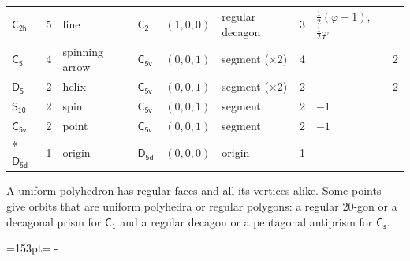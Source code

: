 \documentclass[10pt,a4paper]{article}
\newcommand{\needspace}[1]{\par\penalty-100\begingroup\dimen0=#1\relax\dimen2=\pagegoal
  \advance\dimen2-\pagetotal\ifdim\dimen0>\dimen2\relax\ifdim\dimen2>0pt\vfil\break\fi\fi
  \endgroup}
\numberwithin{equation}{section}
\newcommand{\grp}[1]{\mathsf{#1}}
\newcommand{\goldenratio}{\varphi}
\newlength{\fillwidth}\newlength{\cellwidth}\newlength{\colwidth}
\begin{document}
{{\begin{longtable}{@{}lrllllr>{\RaggedRight\arraybackslash}p{\fillwidth}r@{}}
\href{C2h.pdf}{$\grp{C_{2h}}$} & 5 & line & \href{C2.pdf}{$\grp{C_{2}}$} & $(1, 0, 0)$ & regular decagon & 3 & ${\tfrac{1}{2}(\goldenratio - 1)}$, ${\tfrac{1}{2}\goldenratio{}}$ & \\
\href{C5.pdf}{$\grp{C_{5}}$} & 4 & spinning arrow & \href{C5v.pdf}{$\grp{C_{5v}}$} & $(0, 0, 1)$ & segment (${\times}2$) & 4 &  & 2\\
\href{D5.pdf}{$\grp{D_{5}}$} & 2 & helix & \href{C5v.pdf}{$\grp{C_{5v}}$} & $(0, 0, 1)$ & segment (${\times}2$) & 2 &  & 2\\
\href{S10.pdf}{$\grp{S_{10}}$} & 2 & spin & \href{C5v.pdf}{$\grp{C_{5v}}$} & $(0, 0, 1)$ & segment & 2 & ${-1}$ & \\
\href{C5v.pdf}{$\grp{C_{5v}}$} & 2 & point & \href{C5v.pdf}{$\grp{C_{5v}}$} & $(0, 0, 1)$ & segment & 2 & ${-1}$ & \\*
\href{D5d.pdf}{$\grp{D_{5d}}$} & 1 & origin & \href{D5d.pdf}{$\grp{D_{5d}}$} & $(0, 0, 0)$ & origin & 1 &  & \\
\bottomrule\end{longtable}}}
A uniform polyhedron has regular faces and all its vertices alike. Some points give orbits that are uniform polyhedra or regular polygons: a regular 20-gon or a decagonal prism for \href{C1.pdf}{$\grp{C_{1}}$} and a regular decagon or a pentagonal antiprism for \href{C1v.pdf}{$\grp{C_{s}}$}.
\needspace{153pt}
\end{document}
